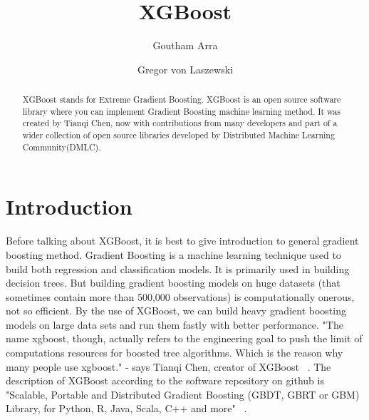 
\title{XGBoost}


\author{Goutham Arra}

\author{Gregor von Laszewski}




\begin{abstract} 
XGBoost stands for Extreme Gradient Boosting. XGBoost is an
open source software library where you can  implement Gradient Boosting machine
learning method. It was created by Tianqi Chen, now with contributions from many
developers and part of a wider collection of open source libraries developed by
Distributed Machine Learning Community(DMLC).
\end{abstract}



\maketitle


\section{Introduction}  

Before talking about XGBoost, it is best to give introduction to general
gradient boosting method. Gradient Boosting is a machine learning technique used
to build both regression and classification models. It is primarily used in
building decision trees. But building gradient boosting models on huge datasets
(that sometimes contain more than 500,000 observations) is computationally
onerous, not so efficient. By the use of XGBoost, we can build  heavy gradient
boosting models on large data sets and run them fastly with better performance.
"The name xgboost, though, actually refers to the engineering goal to push the
limit of computations resources for boosted tree algorithms. Which is the reason
why many people use xgboost." - says Tianqi Chen, creator of XGBoost ~\cite
{hid-sp18-401-XGBoost-MLmastery}. The description of XGBoost according to the
software repository on github is "Scalable, Portable and Distributed Gradient
Boosting (GBDT, GBRT or GBM) Library, for Python, R, Java, Scala, C++ and more"
~\cite{hid-sp18-401-XGBoost-Github}.




